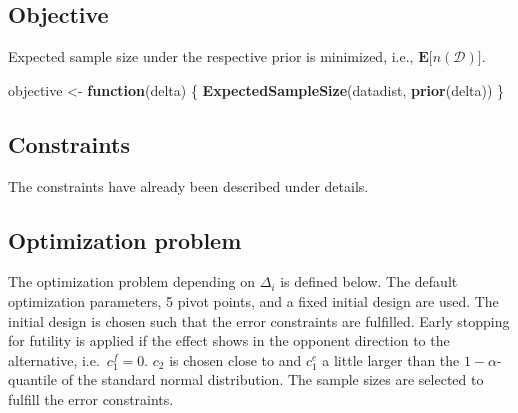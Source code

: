 \documentclass[
]{book}
\newenvironment{Shaded}{\begin{snugshade}}{\end{snugshade}}
\newcommand{\ControlFlowTok}[1]{\textcolor[rgb]{0.13,0.29,0.53}{\textbf{#1}}}
\newcommand{\KeywordTok}[1]{\textcolor[rgb]{0.13,0.29,0.53}{\textbf{#1}}}
\newcommand{\NormalTok}[1]{#1}
\newcommand{\StringTok}[1]{\textcolor[rgb]{0.31,0.60,0.02}{#1}}
\begin{document}
\hypertarget{objective-6}{%
\subsection{Objective}\label{objective-6}}

Expected sample size under the respective prior is minimized, i.e.,
\(\boldsymbol{E}\big[n(\mathcal{D})\big]\).

\begin{Shaded}
\begin{Highlighting}[]
\NormalTok{objective \textless{}{-}}\StringTok{ }\ControlFlowTok{function}\NormalTok{(delta) \{}
    \KeywordTok{ExpectedSampleSize}\NormalTok{(datadist, }\KeywordTok{prior}\NormalTok{(delta))}
\NormalTok{\}}
\end{Highlighting}
\end{Shaded}

\hypertarget{constraints-6}{%
\subsection{Constraints}\label{constraints-6}}

The constraints have already been described under details.

\hypertarget{optimization-problem}{%
\subsection{Optimization problem}\label{optimization-problem}}

The optimization problem depending on \(\Delta_i\) is defined below.
The default optimization parameters, 5 pivot points, and a fixed initial design
are used.
The initial design is chosen such that the error constraints are
fulfilled. Early stopping for futility is applied if the effect shows
in the opponent direction to the alternative, i.e.~\(c_1^f=0\).
\(c_2\) is chosen close to and \(c_1^e\) a little larger than the \(1-\alpha\)-quantile
of the standard normal distribution. The sample sizes are selected
to fulfill the error constraints.
\end{document}
